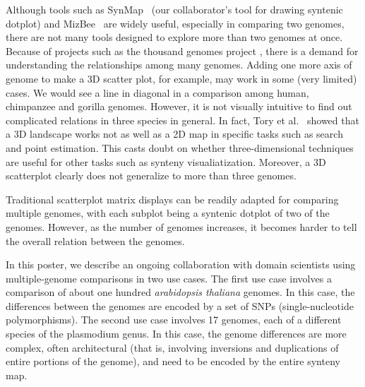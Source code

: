 \documentclass{vgtc}                      %
\begin{document}
Although tools such as SynMap~\cite{synmap} (our collaborator's tool for drawing syntenic dotplot) and MizBee~\cite{meyer2009mizbee} are widely useful, especially in comparing two genomes, there are not many tools designed to explore more than two genomes at once. Because of projects such as the thousand genomes project \cite{thousandgenomes}, there is a demand for understanding the relationships among many genomes.
Adding one more axis of genome to make a 3D scatter plot, for example, may work in some (very limited) cases. We would see a line in diagonal in a comparison among human, chimpanzee and gorilla genomes\cite{synmap3durl}.
However, it is not visually intuitive to find out complicated relations in three species in general. 
In fact, Tory et al.~\cite{tory2007spatialization} showed that a 3D landscape works not as well as a 2D map in specific tasks such as search and point estimation.
This casts doubt on whether three-dimensional techniques are useful for other tasks such as synteny visualiatization.
Moreover, a 3D scatterplot clearly does not generalize to more than three genomes.

Traditional scatterplot matrix displays can be readily adapted for comparing multiple genomes, with each subplot being a syntenic dotplot of two of the genomes.
However, as the number of genomes increases, it becomes harder to tell the overall relation between the genomes.

In this poster, we describe an ongoing collaboration with domain scientists using multiple-genome comparisons in two use cases.
%
The first use case involves a comparison of about one hundred \emph{arabidopsis thaliana} genomes. In this case, the differences between the genomes are encoded by
a set of SNPs (single-nucleotide polymorphisms).
%
The second use case involves 17 genomes, each of a different species of the plasmodium genus. In this case, the genome differences are more complex, often architectural (that is, involving inversions and duplications of entire portions of the genome), and need to be encoded by the entire synteny map.
\end{document}
